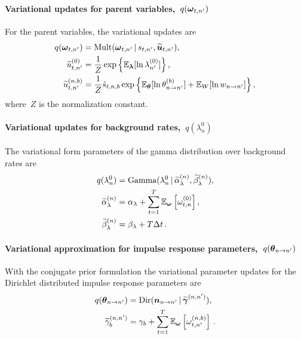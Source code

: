 \paragraph{Variational updates for parent variables,~$q(\boldsymbol{\omega}_{t, n'})$} 
For the parent variables, the variational updates are
\begin{align*}
q(\boldsymbol{\omega}_{t,n'}) &= \mathrm{Mult}(\boldsymbol{\omega}_{t, n'} \,|\, s_{t,n'}, \widetilde{\boldsymbol{u}}_{t,n'}), \\
\widetilde{u}_{t,n'}^{(0)} &= \frac{1}{Z} \exp\left\{\mathbb{E}_{\boldsymbol{\lambda}}[\ln \lambda_{n'}^{(0)}]\right\}, \\
\widetilde{u}_{t,n'}^{(n,b)} &= \frac{1}{Z} \hat{s}_{t,n,b} \exp\left\{\mathbb{E}_{\boldsymbol{\theta}} [\ln \theta_{n \to n'}^{(b)}] + \mathbb{E}_W[\ln w_{n \to n'}]\right\},
\end{align*}
where~$Z$ is the normalization constant.

\paragraph{Variational updates for background rates,~$q(\lambda_n^0)$}
The variational form parameters of the gamma distribution over
background rates are
\begin{align*}
q(\lambda_n^0) &= \mathrm{Gamma}(\lambda_n^{0} \,|\, \widetilde{\alpha}_{\lambda}^{(n)}, \widetilde{\beta}_{\lambda}^{(n)}),  \\
\widetilde{\alpha}_{\lambda}^{(n)} &= \alpha_\lambda + \sum_{t=1}^T \mathbb{E}_{\boldsymbol{\omega}}\left[ \omega_{t,n}^{(0)}\right], \\
\widetilde{\beta}_{\lambda}^{(n)} &= \beta_\lambda + T \Delta t\,.
\end{align*}


\paragraph{Variational approximation for impulse response parameters,~$q(\boldsymbol{\theta}_{n \to n'})$}
With the conjugate prior formulation the variational parameter updates
for the Dirichlet distributed impulse response parameters are
\begin{align*}
q(\boldsymbol{\theta}_{n \to n'}) &= \mathrm{Dir}(\boldsymbol{n}_{n \to n'} \,|\, \widetilde{\boldsymbol{\gamma}}^{(n,n')}), \\
\widetilde{\gamma}_b^{(n,n')} &= \gamma_{b} + \sum_{t=1}^T \mathbb{E}_{\boldsymbol{\omega}}\left[\omega_{t,n'}^{(n,b)}\right]\,.
\end{align*}

